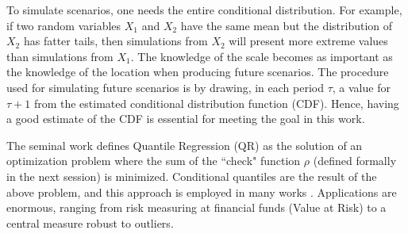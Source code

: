 To simulate scenarios, one needs the entire conditional distribution. For example, if two random variables $X_1$ and $X_2$ have the same mean but the distribution of $X_2$ has fatter tails, then simulations from $X_2$ will present more extreme values than simulations from $X_1$. The knowledge of the scale becomes as important as the knowledge of the location when producing future scenarios. The procedure used for simulating future scenarios is by drawing, in each period $\tau$, a value for $\tau+1$ from the estimated conditional distribution function (CDF). Hence, having a good estimate of the CDF is essential for meeting the goal in this work. 

The seminal work \cite{koenker1978regression} defines Quantile Regression (QR) as the solution of an optimization problem where the sum of the ``check" function $\rho$ (defined formally in the next session) is minimized. Conditional quantiles are the result of the above problem, and this approach is employed in many works \cite{chao_quantile_2012,li_quantile_2007,bosch_convergent_nodate,gallego2016line,moller_time-adaptive_2008,nielsen2006,bremnes_probabilistic_2004,wan_direct_2017}. Applications are enormous, ranging from risk measuring at financial funds (Value at Risk) to a central measure robust to outliers.







%







